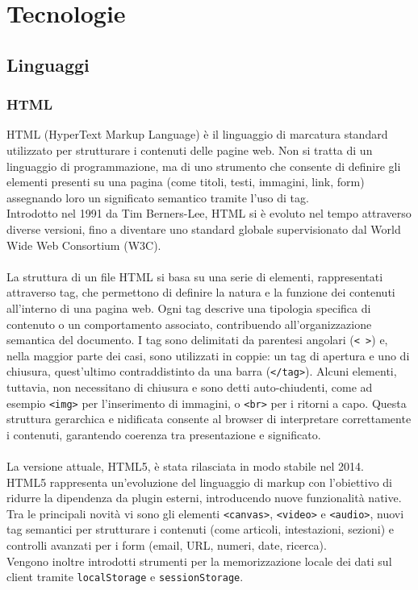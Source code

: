 \chapter{Tecnologie}
\label{chap:linguaggi-tecnologie}

\section{Linguaggi}
\subsection{HTML}
\noindent HTML (HyperText Markup Language) è il linguaggio di marcatura standard utilizzato per strutturare i contenuti delle pagine web. Non si tratta di un linguaggio di programmazione, ma di uno strumento che consente di definire gli elementi presenti su una pagina (come titoli, testi, immagini, link, form) assegnando loro un significato semantico tramite l’uso di tag. \\
Introdotto nel 1991 da Tim Berners-Lee, HTML si è evoluto nel tempo attraverso diverse versioni, fino a diventare uno standard globale supervisionato dal World Wide Web Consortium (W3C).\\
\\
La struttura di un file HTML si basa su una serie di elementi, rappresentati attraverso tag, che permettono di definire la natura e la funzione dei contenuti all'interno di una pagina web. Ogni tag descrive una tipologia specifica di contenuto o un comportamento associato, contribuendo all'organizzazione semantica del documento. I tag sono delimitati da parentesi angolari (\texttt{< >}) e, nella maggior parte dei casi, sono utilizzati in coppie: un tag di apertura e uno di chiusura, quest’ultimo contraddistinto da una barra (\texttt{</tag>}). Alcuni elementi, tuttavia, non necessitano di chiusura e sono detti auto-chiudenti, come ad esempio \texttt{<img>} per l’inserimento di immagini, o \texttt{<br>} per i ritorni a capo. Questa struttura gerarchica e nidificata consente al browser di interpretare correttamente i contenuti, garantendo coerenza tra presentazione e significato.\\
\\
La versione attuale, HTML5, è stata rilasciata in modo stabile nel 2014.\\
HTML5 rappresenta un’evoluzione del linguaggio di markup con l’obiettivo di ridurre la dipendenza da plugin esterni, introducendo nuove funzionalità native. Tra le principali novità vi sono gli elementi \texttt{<canvas>}, \texttt{<video>} e \texttt{<audio>}, nuovi tag semantici per strutturare i contenuti (come articoli, intestazioni, sezioni) e controlli avanzati per i form (email, URL, numeri, date, ricerca). 
\\Vengono inoltre introdotti strumenti per la memorizzazione locale dei dati sul client tramite \texttt{localStorage} e \texttt{sessionStorage}.

